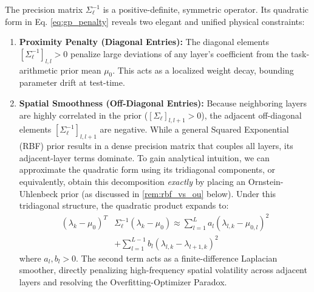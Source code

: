 The precision matrix $\Sigma_{\ell}^{-1}$ is a positive-definite, symmetric
operator. Its quadratic form in Eq. \ref{eq:gp_penalty} reveals two elegant and
unified physical constraints:
\begin{enumerate}
    \item \textbf{Proximity Penalty (Diagonal Entries):} The diagonal elements
    $[\Sigma_{\ell}^{-1}]_{l, l} > 0$ penalize large deviations of any layer's
    coefficient from the task-arithmetic prior mean $\mu_{0}$. This acts as a
    localized weight decay, bounding parameter drift at test-time.
    \item \textbf{Spatial Smoothness (Off-Diagonal Entries):} Because
    neighboring layers are highly correlated in the prior ($[\Sigma_{\ell}]_{l,
    l+1} > 0$), the adjacent off-diagonal elements $[\Sigma_{\ell}^{-1}]_{l,
    l+1}$ are negative. While a general Squared Exponential (RBF) prior results
    in a dense precision matrix that couples all layers, its adjacent-layer
    terms dominate. To gain analytical intuition, we can approximate the
    quadratic form using its tridiagonal components, or equivalently, obtain
    this decomposition \emph{exactly} by placing an Ornstein-Uhlenbeck prior (as
    discussed in \cref{rem:rbf_vs_ou} below). Under this tridiagonal structure, the
    quadratic product expands to:
    \begin{equation}
    \label{eq:precision_expansion}
    \begin{aligned}
    (\lambda_k - \mu_0)^T &\Sigma_{\ell}^{-1} (\lambda_k - \mu_0) \approx
    \sum_{l=1}^L a_l (\lambda_{l, k} - \mu_{0, l})^2 \\
    &+ \sum_{l=1}^{L-1} b_l (\lambda_{l, k} - \lambda_{l+1, k})^2
    \end{aligned}
    \end{equation}
    where $a_l, b_l > 0$. The second term acts as a finite-difference Laplacian
    smoother, directly penalizing high-frequency spatial volatility across
    adjacent layers and resolving the Overfitting-Optimizer Paradox.
\end{enumerate}

